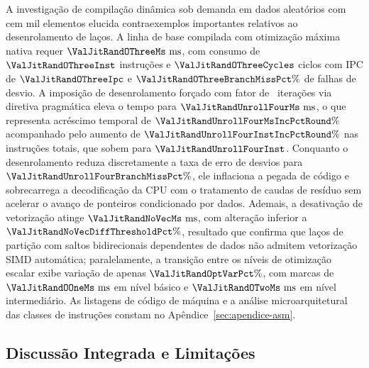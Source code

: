 \documentclass[12pt]{article}
\begin{document}
A investigação de compilação dinâmica sob demanda em dados aleatórios com cem mil elementos elucida contraexemplos importantes relativos ao desenrolamento de laços. A linha de base compilada com otimização máxima nativa requer $\ValJitRandOThreeMs\text{ ms}$, com consumo de $\ValJitRandOThreeInst$ instruções e $\ValJitRandOThreeCycles$ ciclos com IPC de $\ValJitRandOThreeIpc$ e $\ValJitRandOThreeBranchMissPct\%$ de falhas de desvio. A imposição de desenrolamento forçado com fator de \ValUnrollFactor\ iterações via diretiva pragmática eleva o tempo para $\ValJitRandUnrollFourMs\text{ ms}$, o que representa acréscimo temporal de $\ValJitRandUnrollFourMsIncPctRound\%$ acompanhado pelo aumento de $\ValJitRandUnrollFourInstIncPctRound\%$ nas instruções totais, que sobem para $\ValJitRandUnrollFourInst$. Conquanto o desenrolamento reduza discretamente a taxa de erro de desvios para $\ValJitRandUnrollFourBranchMissPct\%$, ele inflaciona a pegada de código e sobrecarrega a decodificação da CPU com o tratamento de caudas de resíduo sem acelerar o avanço de ponteiros condicionado por dados. Ademais, a desativação de vetorização atinge $\ValJitRandNoVecMs\text{ ms}$, com alteração inferior a $\ValJitRandNoVecDiffThresholdPct\%$, resultado que confirma que laços de partição com saltos bidirecionais dependentes de dados não admitem vetorização SIMD automática; paralelamente, a transição entre os níveis de otimização escalar exibe variação de apenas $\ValJitRandOptVarPct\%$, com marcas de $\ValJitRandOOneMs\text{ ms}$ em nível básico e $\ValJitRandOTwoMs\text{ ms}$ em nível intermediário. As listagens de código de máquina e a análise microarquitetural das classes de instruções constam no Apêndice~\ref{sec:apendice-asm}.

\subsection{Discussão Integrada e Limitações}\label{sec:res-discussao}
\end{document}
